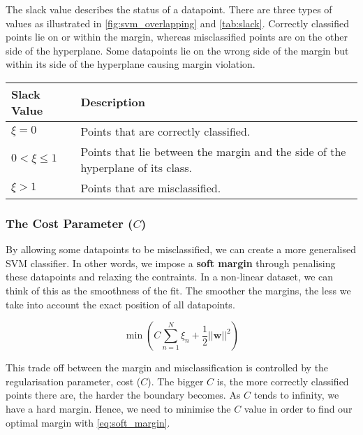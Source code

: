 The slack value describes the status of a datapoint. There are three types of values as illustrated in \autoref{fig:svm_overlapping} and \autoref{tab:slack}. Correctly classified points lie on or within the margin, whereas misclassified points are on the other side of the hyperplane. Some datapoints lie on the wrong side of the margin but within its side of the hyperplane causing margin violation.

\parbox{\linewidth} {
	\centering
  \begin{tabularx}{\textwidth}{|l|X|}
    \hline
    \textbf{Slack Value}	& \textbf{Description}
    \\ \hline
    $\xi = 0$ 					  & Points that are correctly classified.
    \\ \hline
    $0 < \xi \leq 1$     	& Points that lie between the margin and the side of the hyperplane of its class.
		\\ \hline
    $\xi > 1$  						& Points that are misclassified.
    \\ \hline

  \end{tabularx}
	\label{tab:slack}
}

\subsubsection{The Cost Parameter ($C$)}
By allowing some datapoints to be misclassified, we can create a more generalised SVM classifier. In other words, we impose a \textbf{soft margin} through penalising these datapoints and relaxing the contraints. In a non-linear dataset, we can think of this as the smoothness of the fit. The smoother the margins, the less we take into account the exact position of all datapoints. 

\begin{equation} \label{eq:soft_margin}
	\min \left ( C \sum_{n=1}^{N} \xi_{n} + \frac{1}{2}||\mathbf{w}||^2 \right )
\end{equation}

This trade off between the margin and misclassification is controlled by the regularisation parameter, cost ($C$). The bigger $C$ is, the more correctly classified points there are, the harder the boundary becomes. As $C$ tends to infinity, we have a hard margin. Hence, we need to minimise the $C$ value in order to find our optimal margin with \autoref{eq:soft_margin}.

